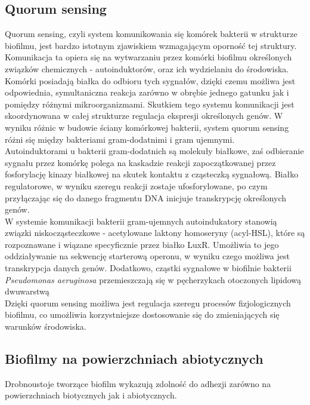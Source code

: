 \documentclass[11pt,a4paper]{report}
\begin{document}
\subsection*{Quorum sensing}
Quorum sensing, czyli system komunikowania się komórek bakterii w strukturze biofilmu, jest bardzo istotnym zjawiskiem wzmagającym oporność tej struktury.
Komunikacja ta opiera się na wytwarzaniu przez komórki biofilmu określonych związków chemicznych - autoinduktorów, oraz ich wydzielaniu do środowiska. Komórki posiadają białka do odbioru tych sygnałów, dzięki czemu możliwa jest odpowiednia, symultaniczna reakcja zarówno w obrębie jednego gatunku jak i pomiędzy różnymi mikroorganizmami\cite{leginowicz}. 
Skutkiem tego systemu komunikacji jest skoordynowana w całej strukturze regulacja ekspresji określonych genów\cite{kolodynski}.
W wyniku różnic w budowie ściany komórkowej bakterii, system quorum sensing różni się między bakteriami gram-dodatnimi i gram ujemnymi.\\
Autoinduktorami u bakterii gram-dodatnich są molekuły białkowe, zaś odbieranie sygnału przez komórkę polega na kaskadzie reakcji zapoczątkowanej przez fosforylację kinazy białkowej na skutek kontaktu z cząsteczką sygnałową. Białko regulatorowe, w wyniku szeregu reakcji zostaje ufosforylowane, po czym przyłączając się do danego fragmentu DNA inicjuje transkrypcję określonych genów.\\
W systemie komunikacji bakterii gram-ujemnych autoindukatory stanowią związki niskocząsteczkowe - acetylowane laktony homoseryny (acyl-HSL), które są rozpoznawane i wiązane specyficznie przez białko LuxR. Umożliwia to jego oddziaływanie na sekwencję starterową operonu, w wyniku czego możliwa jest transkrypcja danych genów\cite{czaczyk-myszka, zajac}.
Dodatkowo, cząstki sygnałowe w biofilnie bakterii \textit{Pseudomonas aeruginosa} przemieszczają się w pęcherzykach otoczonych lipidową dwuwarstwą\cite{membrane, smith}\\
Dzięki quorum sensing możliwa jest regulacja szeregu procesów fizjologicznych biofilmu, co umożliwia korzystniejsze dostosowanie się do zmieniających się warunków środowiska\cite{czaczyk-myszka, leginowicz}.





\subsection{Biofilmy na powierzchniach abiotycznych}
Drobnoustoje tworzące biofilm wykazują zdolność do adhezji zarówno na powierzchniach biotycznych jak i abiotycznych\cite{czaczyk-myszka}.
\end{document}

